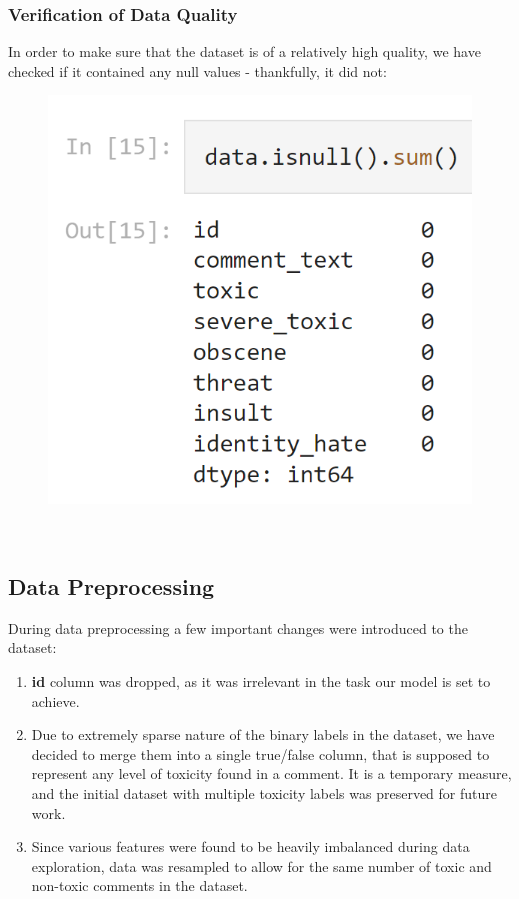 \documentclass[]{article}
\begin{document}
	\subsubsection{Verification of Data Quality}
	
	In order to make sure that the dataset is of a relatively high quality, we have checked if it contained any null values - thankfully, it did not: 
	\begin{figure}[h]
		\includegraphics[scale=0.9]{screenshot3.png}
	\end{figure}\\
	
	\subsection{Data Preprocessing}
	
	During data preprocessing a few important changes were introduced to the dataset:
	\begin{enumerate}
		\item \textbf{id} column was dropped, as it was irrelevant in the task our model is set to achieve.
		\item Due to extremely sparse nature of the binary labels in the dataset, we have decided to merge them into a single true/false column, that is supposed to represent any level of toxicity found in a comment. It is a temporary measure, and the initial dataset with multiple toxicity labels was preserved for future work.
		\item Since various features were found to be heavily imbalanced during data exploration, data was resampled to allow for the same number of toxic and non-toxic comments in the dataset.
	\end{enumerate}
\end{document}
